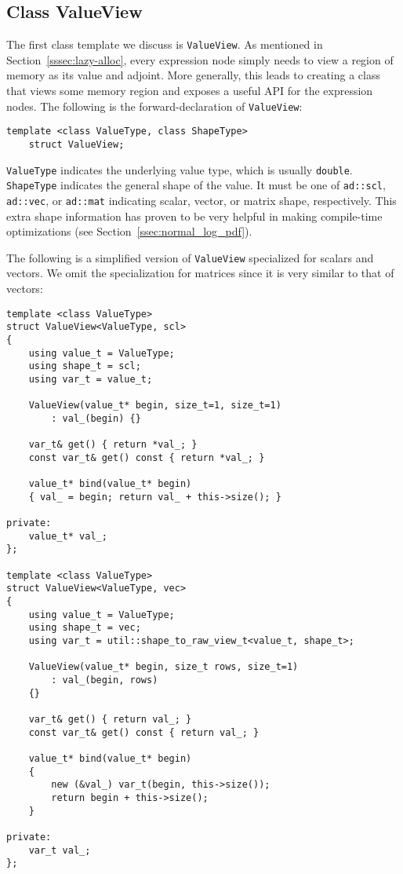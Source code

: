\subsection{Class ValueView}\label{ssec:value_view}

The first class template we discuss is \verb|ValueView|.
As mentioned in Section~\ref{sssec:lazy-alloc},
every expression node simply needs to view a region of memory as its value and adjoint.
More generally, this leads to creating a class that views some memory region
and exposes a useful API for the expression nodes.
The following is the forward-declaration of \verb|ValueView|:
\begin{lstlisting}[style=customcpp]
    template <class ValueType, class ShapeType>
    struct ValueView;
\end{lstlisting}
\verb|ValueType| indicates the underlying value type, which is usually \verb|double|.
\verb|ShapeType| indicates the general shape of the value.
It must be one of \verb|ad::scl|, \verb|ad::vec|, or \verb|ad::mat| 
indicating scalar, vector, or matrix shape, respectively.
This extra shape information has proven to be very helpful in making compile-time optimizations
(see Section~\ref{ssec:normal_log_pdf}).

The following is a simplified version of \verb|ValueView| specialized for scalars and vectors.
We omit the specialization for matrices since it is very similar to that of vectors:
\begin{lstlisting}[style=customcpp]
template <class ValueType>
struct ValueView<ValueType, scl>
{
    using value_t = ValueType;
    using shape_t = scl;
    using var_t = value_t;

    ValueView(value_t* begin, size_t=1, size_t=1)
        : val_(begin) {}

    var_t& get() { return *val_; }
    const var_t& get() const { return *val_; }

    value_t* bind(value_t* begin)
    { val_ = begin; return val_ + this->size(); }

private:
    value_t* val_;
};

template <class ValueType>
struct ValueView<ValueType, vec>
{
    using value_t = ValueType;
    using shape_t = vec;
    using var_t = util::shape_to_raw_view_t<value_t, shape_t>;

    ValueView(value_t* begin, size_t rows, size_t=1)
        : val_(begin, rows)
    {}
     
    var_t& get() { return val_; }
    const var_t& get() const { return val_; }

    value_t* bind(value_t* begin)
    { 
        new (&val_) var_t(begin, this->size());
        return begin + this->size(); 
    }

private:
    var_t val_;
};
\end{lstlisting}


